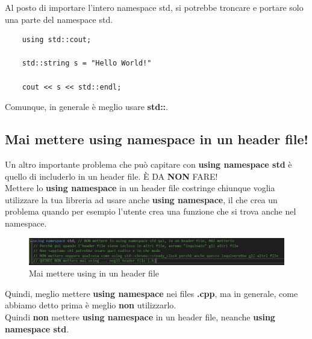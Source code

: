 \textsf{\small Al posto di importare l'intero namespace std, si potrebbe troncare e portare solo una parte del namespace std.} \\

\begin{lstlisting}
	using std::cout;
	
	std::string s = "Hello World!"
	
	cout << s << std::endl;
\end{lstlisting}

\textsf{\small Comunque, in generale è meglio usare \textbf{std::}.} \\

\subsection{Mai mettere using namespace in un header file!}

\textsf{\small Un altro importante problema che può capitare con \textbf{using namespace std} è quello di includerlo in un header file. È DA \textbf{NON} FARE!} \\

\textsf{\small Mettere lo \textbf{using namespace} in un header file costringe chiunque voglia utilizzare la tua libreria ad usare anche \textbf{using namespace}, il che crea un problema quando per esempio l'utente crea una funzione che si trova anche nel namespace.}

\begin{figure}[ht]
	\centering
	\includegraphics[width=1\textwidth, height=1\textheight, keepaspectratio]{./imgs/MAI_mettere_USING_negli_header_files.png}
	\caption{Mai mettere using in un header file}
	\label{fig:never_using_in_header}
\end{figure}

\textsf{\small Quindi, meglio mettere \textbf{using namespace} nei files \textbf{.cpp}, ma in generale, come abbiamo detto prima è meglio \textbf{non} utilizzarlo.} \\

\textsf{\small Quindi \textbf{non} mettere \textbf{using namespace} in un header file, neanche \textbf{using namespace std}.} \\


